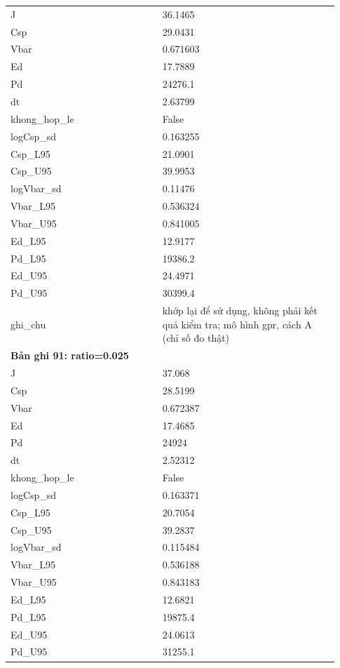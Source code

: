 \begin{longtable}{p{0.43\linewidth}p{0.50\linewidth}}
J & 36.1465 \\
Csp & 29.0431 \\
Vbar & 0.671603 \\
Ed & 17.7889 \\
Pd & 24276.1 \\
dt & 2.63799 \\
khong\_\allowbreak hop\_\allowbreak le & False \\
logCsp\_\allowbreak sd & 0.163255 \\
Csp\_\allowbreak L95 & 21.0901 \\
Csp\_\allowbreak U95 & 39.9953 \\
logVbar\_\allowbreak sd & 0.11476 \\
Vbar\_\allowbreak L95 & 0.536324 \\
Vbar\_\allowbreak U95 & 0.841005 \\
Ed\_\allowbreak L95 & 12.9177 \\
Pd\_\allowbreak L95 & 19386.2 \\
Ed\_\allowbreak U95 & 24.4971 \\
Pd\_\allowbreak U95 & 30399.4 \\
ghi\_\allowbreak chu & khớp lại để sử dụng, không phải kết quả kiểm tra; mô hình gpr, cách A (chỉ số đo thật) \\
\midrule
\multicolumn{2}{p{0.95\linewidth}}{\textbf{Bản ghi 91: ratio=0.025}} \\
J & 37.068 \\
Csp & 28.5199 \\
Vbar & 0.672387 \\
Ed & 17.4685 \\
Pd & 24924 \\
dt & 2.52312 \\
khong\_\allowbreak hop\_\allowbreak le & False \\
logCsp\_\allowbreak sd & 0.163371 \\
Csp\_\allowbreak L95 & 20.7054 \\
Csp\_\allowbreak U95 & 39.2837 \\
logVbar\_\allowbreak sd & 0.115484 \\
Vbar\_\allowbreak L95 & 0.536188 \\
Vbar\_\allowbreak U95 & 0.843183 \\
Ed\_\allowbreak L95 & 12.6821 \\
Pd\_\allowbreak L95 & 19875.4 \\
Ed\_\allowbreak U95 & 24.0613 \\
Pd\_\allowbreak U95 & 31255.1 \\

\end{longtable}

